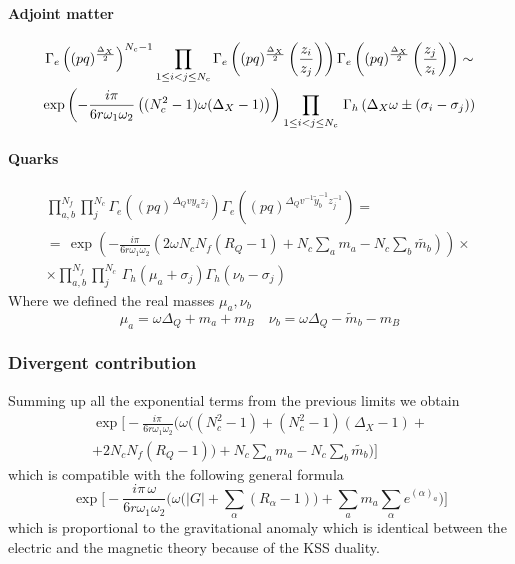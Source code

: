 \paragraph{Adjoint matter}

\begin{multline}
 \Gamma_e \left((pq)^{\frac{\Delta_X}{2}} \right)^{N_c -1} 
 \prod_{1 \leq i <j \leq N_c} 
\Gamma_e \left( (pq)^{\frac{\Delta_X}{2}} \left( { z_i \over z_j} \right) \right) \Gamma_e \left( (pq)^{\frac{\Delta_X}{2}} \left( { z_j \over z_i} \right) \right) \sim \\
 \exp \left(- \frac{i \pi} {6 r \omega_1 \omega_2 }  \left( (N_c^2-1) \omega (\Delta_X - 1)  \right) \right)   \prod_{1 \leq i <j \leq N_c} 
	\, \Gamma_h \left( \Delta_X \omega \pm (\sigma_i - \sigma_j) \right) 
\end{multline}


\paragraph{Quarks}

\begin{multline}
\prod_{a,b}^{N_f} \prod_{j}^{N_c}
\Gamma_e\left(
(pq)^{\Delta_Q v y_a z_j }\right) 
\Gamma_e\left(
(pq)^{\Delta_Q v^{-1} \tilde{y}_b^{-1} z_j^{-1} } \right)  = \\
=\, \exp \left( {- \frac{i \pi} {6 r \omega_1 \omega_2 }  ( 2 \omega N_c N_f  (R_Q - 1) + N_c \sum_a m_a - N_c \sum_b \tilde {m_b} )} \right) \times  \, 
\\
\times
\prod_{a,b}^{N_f} \prod_{j}^{N_c}
 \, \Gamma_h ( \mu_a + \sigma_j) \Gamma_h ( \nu_b- \sigma_j)
\end{multline}
Where we defined the real masses $\mu_a,\nu_b$
\begin{equation}
 \mu_a = \omega \Delta_Q + m_a + m_B  \quad  \nu_b = \omega \Delta_Q - \tilde m_b - m_B
\end{equation}

\subsubsection{Divergent contribution}
Summing up all the exponential terms from the previous limits we obtain
\begin{multline}
 \exp 
 \biggl[
 -\frac{i \pi\,  } {6 r \omega_1 \omega_2 }   
 \biggl(
 \omega \biggl(   (N_c^2 -1) +  (N_c^2 - 1) (\Delta_X -1) + \\ 
	 + 2  N_c N_f  (R_Q - 1) \biggr) 
		+ N_c \sum_a m_a - N_c \sum_b \tilde {m_b} \biggr)
\biggr]
\end{multline}
which is compatible with the following general formula \cite{Aharony:2013dha}
\begin{equation}
 \exp 
 \biggl[
 -\frac{i \pi\,  \omega} {6 r \omega_1 \omega_2 }   
 \biggl(
 \omega \biggl(
	|G| + \sum_{\alpha}(R_{ \alpha} -1 ) 
	\biggr)
	 + \sum_a m_a \sum_{\alpha} e^{(\alpha)_a}
 \biggr)
\biggl]
\end{equation}
which is proportional to the gravitational anomaly \cite{Aharony:2013dha}
which is identical between the electric and the magnetic theory because of the KSS duality.

